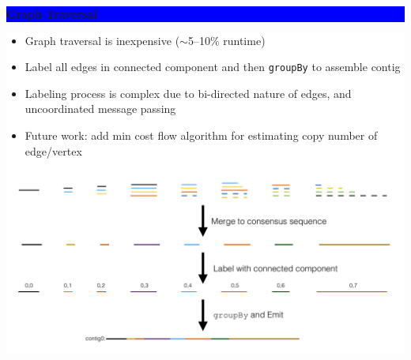 \documentclass[11pt]{a0poster}
\begin{document}
{\begin{minipage}[t][2045pt][t]{\linewidth}
\begin{minipage}{0.6\linewidth}
\vspace{75pt}
\begin{minipage}{\linewidth}
\colorbox{Blue}{
\begin{minipage}[t]{\linewidth}
\vspace{30pt}
\begin{center}
\Huge \bf \color{White} Graph Traversal
\end{center}
\vspace{17pt}
\end{minipage}
}
\colorbox{White}{
\begin{minipage}[t][480pt][t]{\linewidth}
\begin{minipage}{0.45\linewidth}
\LARGE
\color{Blue}
\begin{itemize}
\item Graph traversal is inexpensive ($\sim$5--10\% runtime)
\item Label all edges in connected component and then \texttt{groupBy} to assemble contig
\item Labeling process is complex due to bi-directed nature of edges, and uncoordinated message passing
\item Future work: add min cost flow algorithm for estimating copy number of edge/vertex
\end{itemize}
\end{minipage}
\begin{minipage}{0.03\linewidth}
\hfill
\pagebreak
\end{minipage}
\begin{minipage}{0.5\linewidth}
\color{Blue}
\begin{center}
\end{center}
\color{Blue}
\begin{center}
\vspace{20pt}
\includegraphics[width=0.9\linewidth]{walk-graph.pdf}
\end{center}
\end{minipage}
\end{minipage}
}
\end{minipage}
\end{minipage}
\end{minipage}
}
\end{document}
